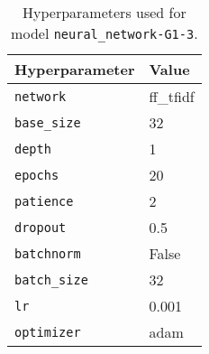 \begin{table}[H]
\centering
\capstart
\begin{tabularx}{0.48\textwidth}{|X|l|}
\hline
Hyperparameter & Value \\
\hline
\texttt{network} & ff\_tfidf \\
\texttt{base\_size} & 32 \\
\texttt{depth} & 1 \\
\texttt{epochs} & 20 \\
\texttt{patience} & 2 \\
\texttt{dropout} & 0.5 \\
\texttt{batchnorm} & False \\
\texttt{batch\_size} & 32 \\
\texttt{lr} & 0.001 \\
\texttt{optimizer} & adam \\
\hline
\end{tabularx}
\caption{Hyperparameters used for model \texttt{neural\_network-G1-3}.}
\label{tab:hyperparameters_best_neural_network}

\end{table}
